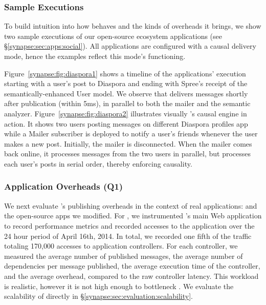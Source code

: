 \subsubsection{Sample Executions}
\label{synapse:sec:evaluation:sample-runs}

To build intuition into how \synapse behaves and the kinds of overheads it
brings, we show two sample executions of our open-source ecosystem
applications (see \S\ref{synapse:sec:apps:social}). All applications are configured
with a causal delivery mode, hence the examples reflect this mode's functioning.

Figure~\ref{synapse:fig:diaspora1} shows a timeline of the applications' execution
starting with a user's post to Diaspora and ending with Spree's receipt of the
semantically-enhanced User model. We observe that \synapse delivers messages
shortly after publication (within 5ms), in parallel to both the mailer and
the semantic analyzer.  Figure~\ref{synapse:fig:diaspora2}  illustrates visually
\synapse's causal engine in action. It shows two users posting messages on
different Diaspora profiles app while a Mailer subscriber is deployed to notify
a user's friends whenever the user makes a new post.  Initially, the mailer is
disconnected. When the mailer comes back online, it processes messages from the
two users in parallel, but processes each user's posts in serial order, thereby
enforcing causality.

\setlength{\tabcolsep}{4pt}

\subsubsection{Application Overheads (Q1)}
\label{synapse:sec:evaluation:overhead}

We next evaluate \synapse's publishing overheads in the context of real
applications: \crowdtap and the open-source apps we modified. For \crowdtap, we
instrumented \crowdtap's main Web application to record performance metrics and
recorded accesses to the application over the 24 hour period of April 16th,
2014. In total, we recorded one fifth of the traffic totaling 170,000 accesses
to application controllers. For each controller, we measured the average
number of published messages, the average number of dependencies per message
published, the average execution time of the controller, and the average
\synapse overhead, compared to the raw controller latency. This workload is
realistic, however it is not high enough to bottleneck \synapse. We evaluate
the scalability of \synapse directly in \S\ref{synapse:sec:evaluation:scalability}.

